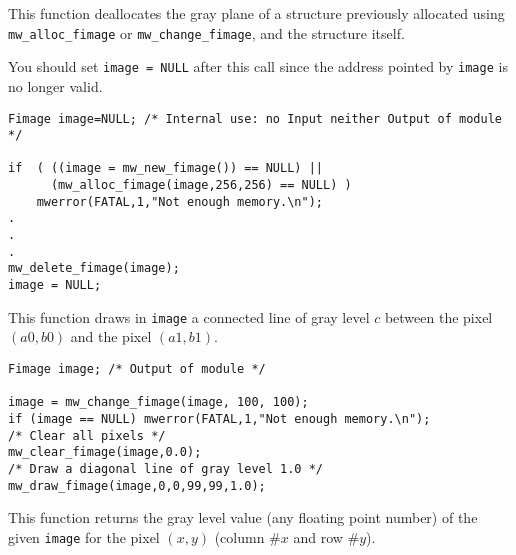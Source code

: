 \newpage %

\Description
This function deallocates the gray plane of a \fimage structure previously
allocated using \verb+mw_alloc_fimage+ or \verb+mw_change_fimage+, and the
structure itself. 

You should set \verb+image = NULL+ after this call since the address pointed
by \verb+image+ is no longer valid.

\Next
\Example
\begin{verbatim}
Fimage image=NULL; /* Internal use: no Input neither Output of module */

if  ( ((image = mw_new_fimage()) == NULL) ||
      (mw_alloc_fimage(image,256,256) == NULL) )
    mwerror(FATAL,1,"Not enough memory.\n");
.
.
.
mw_delete_fimage(image);
image = NULL;

\end{verbatim}

\newpage %


\Description
This function draws in \verb+image+ a connected line of gray level $c$ between the pixel $(a0,b0)$ and the pixel $(a1,b1)$.

\Next
\Example
\begin{verbatim}
Fimage image; /* Output of module */

image = mw_change_fimage(image, 100, 100);
if (image == NULL) mwerror(FATAL,1,"Not enough memory.\n");
/* Clear all pixels */
mw_clear_fimage(image,0.0);
/* Draw a diagonal line of gray level 1.0 */
mw_draw_fimage(image,0,0,99,99,1.0);
\end{verbatim}

\newpage %

\Description
This function returns the gray level value (any floating point number) of the given \verb+image+ for the pixel $(x,y)$ (column $\# x$ and row $\# y$).

